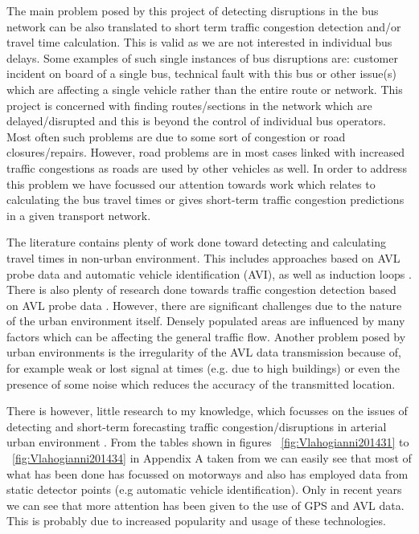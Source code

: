 The main problem posed by this project of detecting disruptions in the bus network can be also translated to short term traffic congestion detection and/or travel time calculation. This is valid as we are not interested in individual bus delays. Some examples of such single instances of bus disruptions are: customer incident on board of a single bus, technical fault with this bus or other issue(s) which are affecting a single vehicle rather than the entire route or network. This project is concerned with finding routes/sections in the network which are delayed/disrupted and this is beyond the control of individual bus operators. Most often such problems are due to some sort of congestion or road closures/repairs. However, road problems are in most cases linked with increased traffic congestions as roads are used by other vehicles as well. In order to address this problem we have focussed our attention towards work which relates to calculating the bus travel times or gives short-term traffic congestion predictions in a given transport network.

The literature contains plenty of work done toward detecting and calculating travel times in non-urban environment. This includes approaches based on AVL probe data and automatic vehicle identification (AVI), as well as induction loops \cite{Vlahogianni20143}. There is also plenty of research done towards traffic congestion detection based on AVL probe data \cite{Vlahogianni20143}. However, there are significant challenges due to the nature of the urban environment itself. Densely populated areas are influenced by many factors which can be affecting the general traffic flow. Another problem posed by urban environments is the irregularity of the AVL data transmission because of, for example weak or lost signal at times (e.g. due to high buildings) or even the presence of some noise which reduces the accuracy of the transmitted location. 

There is however, little research to my knowledge, which focusses on the issues of detecting and short-term forecasting traffic congestion/disruptions in arterial urban environment  \cite{Vlahogianni20143, 5625144}. From the tables shown in figures ~\ref{fig:Vlahogianni201431} to ~\ref{fig:Vlahogianni201434} in Appendix A taken from \cite{Vlahogianni20143} we can easily see that most of what has been done has focussed on motorways and also has employed data from static detector points (e.g automatic vehicle identification). Only in recent years we can see that more attention has been given to the use of GPS and AVL data. This is probably due to increased popularity and usage of these technologies.

